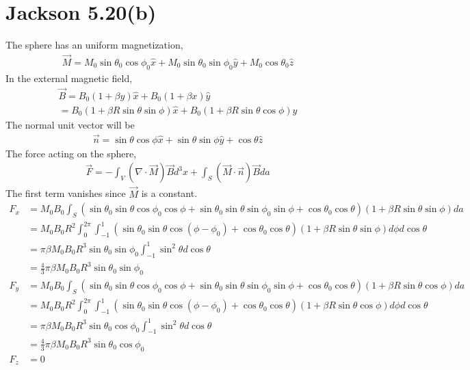 \documentclass{article}
\begin{document}
\section*{Jackson 5.20(b)}

The sphere has an uniform magnetization,
\begin{align*}
  \vec M=M_0\sin\theta_0\cos\phi_0\hat x+M_0\sin\theta_0\sin\phi_0\hat y+M_0\cos\theta_0\hat z
\end{align*}
In the external magnetic field,
\begin{align*}
  \vec B=B_0(1+\beta y)\hat x+B_0(1+\beta x)\hat y\\
  =B_0(1+\beta R\sin\theta\sin\phi)\hat x+B_0(1+\beta R\sin\theta\cos\phi)\hat y
\end{align*}
The normal unit vector will be
\begin{align*}
  \vec n=\sin\theta\cos\phi\hat x+\sin\theta\sin\phi\hat y+\cos\theta\hat z
\end{align*}
The force acting on the sphere,
\begin{align*}
  \vec F=-\int_V(\nabla\cdot\vec M)\vec B d^3x+\int_S(\vec M\cdot\vec n)\vec B da
\end{align*}
The first term vanishes since $\vec M$ is a constant.
\begin{align*}
  F_x&=M_0B_0\int_S(\sin\theta_0\sin\theta\cos\phi_0\cos\phi+\sin\theta_0\sin\theta\sin\phi_0\sin\phi+\cos\theta_0\cos\theta)(1+\beta R\sin\theta\sin\phi)da\\
  &=M_0B_0R^2\int_0^{2\pi}\int_{-1}^{1}(\sin\theta_0\sin\theta\cos(\phi-\phi_0)+\cos\theta_0\cos\theta)(1+\beta R\sin\theta\sin\phi)d\phi d\cos\theta\\
     &=\pi\beta M_0B_0R^3\sin\theta_0\sin\phi_0\int_{-1}^{1}\sin^2\theta d\cos\theta\\
  &=\frac{4}{3}\pi\beta M_0B_0R^3\sin\theta_0\sin\phi_0\\
  F_y&=M_0B_0\int_S(\sin\theta_0\sin\theta\cos\phi_0\cos\phi+\sin\theta_0\sin\theta\sin\phi_0\sin\phi+\cos\theta_0\cos\theta)(1+\beta R\sin\theta\cos\phi)da\\
     &=M_0B_0R^2\int_0^{2\pi}\int_{-1}^{1}(\sin\theta_0\sin\theta\cos(\phi-\phi_0)+\cos\theta_0\cos\theta)(1+\beta R\sin\theta\cos\phi)d\phi d\cos\theta\\
  &=\pi\beta M_0B_0R^3\sin\theta_0\cos\phi_0\int_{-1}^{1}\sin^2\theta d\cos\theta\\
     &=\frac{4}{3}\pi\beta M_0B_0R^3\sin\theta_0\cos\phi_0\\
  F_z&=0
\end{align*}
\pagebreak
\end{document}
